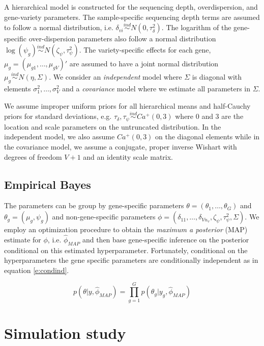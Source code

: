 \documentclass[useAMS,usenatbib,referee]{biom}
\begin{document}
A hierarchical model is constructed for the sequencing depth, overdispersion, and gene-variety parameters. The sample-specific sequencing depth terms are assumed to follow a normal distribution, i.e. $\delta_{vi} \stackrel{ind}{\sim} N(0,\tau_\delta^2)$. The logarithm of the gene-specific over-dispersion parameters also follow a normal distribution $\log(\psi_g) \stackrel{ind}{\sim} N(\zeta_\psi,\tau_\psi^2)$. The variety-specific effects for each gene, $\mu_g = (\mu_{g1},\ldots,\mu_{gV})'$ are assumed to have a joint normal distribution $\mu_g \stackrel{ind}{\sim} N(\eta, \Sigma)$. We consider an \emph{independent} model where $\Sigma$ is diagonal with elements $\sigma_1^2,\ldots,\sigma_V^2$ and a \emph{covariance} model where we estimate all parameters in $\Sigma$. 

We assume improper uniform priors for all hierarchical means and half-Cauchy priors for standard deviations, e.g. $\tau_\delta, \tau_\psi \stackrel{ind}{\sim} Ca^+(0,3)$ where 0 and 3 are the location and scale parameters on the untruncated distribution. In the independent model, we also assume $Ca^+(0,3)$ on the diagonal elements while in the covariance model, we assume a conjugate, proper inverse Wishart with degrees of freedom $V+1$ and an identity scale matrix. 

\subsection{Empirical Bayes}
\label{s:ebayes}

The parameters can be group by gene-specific parameters $\theta = (\theta_1,\ldots,\theta_G)$ and $\theta_g = (\mu_g,\psi_g)$ and non-gene-specific parameters $\phi = (\delta_{11},\ldots,\delta_{Vn_v}, \zeta_\psi, \tau_\psi^2, \Sigma)$. We employ an optimization procedure to obtain the \emph{maximum a posterior} (MAP) estimate for $\phi$, i.e. $\hat{\phi}_{MAP}$ and then base gene-specific inference on the posterior conditional on this estimated hyperparameter. Fortunately, conditional on the hyperparameters the gene specific parameters are conditionally independent as in equation \eqref{e:condind}. 

\begin{equation}
p(\theta|y,\hat{\phi}_{MAP}) = \prod_{g=1}^G p(\theta_g|y_g,\hat{\phi}_{MAP}) 
\label{e:condind}
\end{equation}

\section{Simulation study}
\label{s:simulation}
\end{document}
